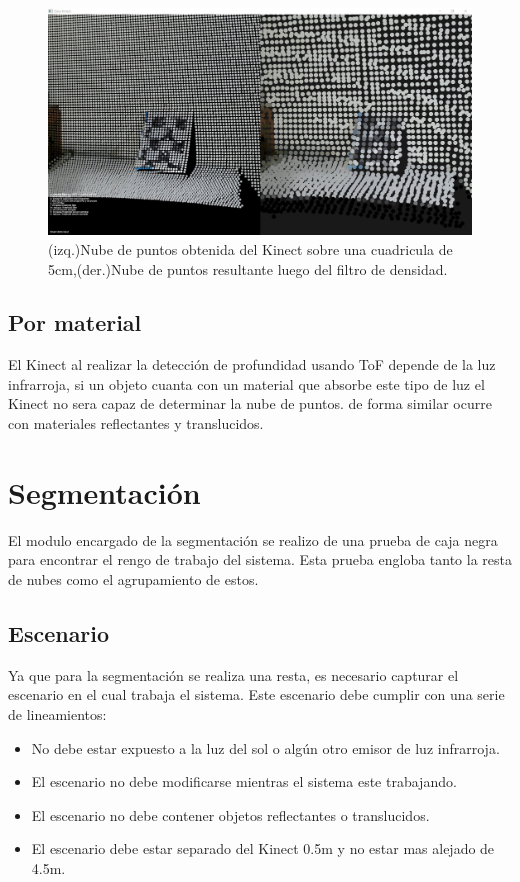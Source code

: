	
	\begin{figure} [H]
		\centering
		\includegraphics[width=1\textwidth]{03Resultados/imagenes/downsample.JPG}
		\caption{(izq.)Nube de puntos obtenida del Kinect sobre una cuadricula de 5cm,(der.)Nube de puntos resultante luego del filtro de densidad.} 
		\label{fig:coutPoints}
	\end{figure}
	
	
	\subsection{Por material}
	El Kinect al realizar la detección de profundidad usando ToF depende de la luz infrarroja, si un objeto cuanta con un material que absorbe este tipo de luz el Kinect no sera capaz de determinar la nube de puntos. de forma similar ocurre con materiales reflectantes y translucidos.\\
	
\section{Segmentación}

	El modulo encargado de la segmentación se realizo de una prueba de caja negra para encontrar el rengo de trabajo del sistema. Esta prueba engloba tanto la resta de nubes como el agrupamiento de estos.\\
	\subsection{Escenario}
	Ya que para la segmentación se realiza una resta, es necesario capturar el escenario en el cual trabaja el sistema. Este escenario debe cumplir con una serie de lineamientos:
	\begin{itemize}
		\item No debe estar expuesto a la luz del sol o algún otro emisor de luz infrarroja.
		\item El escenario no debe modificarse mientras el sistema este trabajando.
		\item El escenario no debe contener objetos reflectantes o translucidos.
		\item El escenario debe estar separado del Kinect 0.5m y no estar mas alejado de 4.5m.
	\end{itemize}

